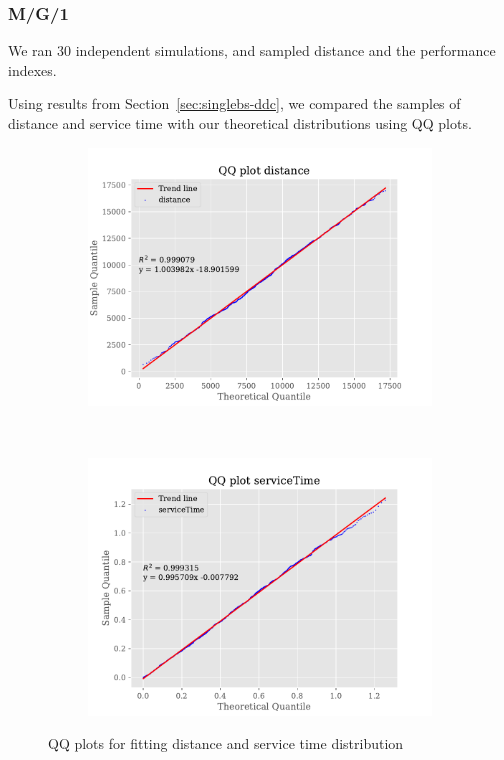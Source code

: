 \documentclass[a4paper,12pt]{article}
\begin{document}
\subsubsection{M/G/1}
We ran 30 independent simulations, and sampled distance and the performance indexes.

Using results from Section~\ref{sec:singlebs-ddc}, we compared the samples of distance and service time with our theoretical distributions using QQ plots.

\begin{figure}[H]
  \centering
  \begin{subfigure}[b]{0.45\textwidth}
    \centering
    \includegraphics[width=\textwidth]{img/qq-distance.pdf}
    \label{fig:qq-distance}
  \end{subfigure}
  ~
  \begin{subfigure}[b]{0.45\textwidth}
    \centering
    \includegraphics[width=\textwidth]{img/qq-servicetime.pdf}
    \label{fig:qq-servicetime}
  \end{subfigure}
  \caption{QQ plots for fitting distance and service time distribution}
  \label{fig:d}
  \label{fig:qqplots}
\end{figure}
\end{document}
